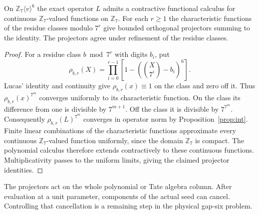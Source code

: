 \documentclass[11pt]{article}
\begin{document}
\begin{proposition}\label{prop:projectors}
On $\mathbb Z_7\langle v\rangle^6$ the exact operator $L$ admits
a contractive functional calculus for continuous
$\mathbb Z_7$-valued functions on $\mathbb Z_7$.
For each $r\ge1$ the characteristic functions of the residue
classes modulo $7^r$ give bounded orthogonal projectors
summing to the identity. The projectors agree under refinement
of the residue classes.
\end{proposition}
\begin{proof}
For a residue class $b\bmod7^r$ with digits $b_i$, put
\[
 \rho_{b,r}(X)=
 \prod_{i=0}^{r-1}
 \left[1-\left(\binom X{7^i}-b_i\right)^6\right].
\]
Lucas' identity and continuity give $\rho_{b,r}(x)\equiv1$
on the class and zero off it. Thus $\rho_{b,r}(x)^{7^m}$ converges
uniformly to its characteristic function. On the class its
difference from one is divisible by $7^{m+1}$. Off the class
it is divisible by $7^{7^m}$. Consequently
$\rho_{b,r}(L)^{7^m}$ converges in operator norm by
Proposition~\ref{prop:int}.
Finite linear combinations of the characteristic functions
approximate every continuous $\mathbb Z_7$-valued function
uniformly, since the domain $\mathbb Z_7$ is compact.
The polynomial calculus therefore extends contractively to
these continuous functions. Multiplicativity passes to the
uniform limits, giving the claimed projector identities.
\end{proof}

The projectors act on the whole polynomial or Tate algebra
column. After evaluation at a unit parameter, components of the
actual seed can cancel. Controlling that cancellation is a
remaining step in the physical gap-six problem.
\end{document}
